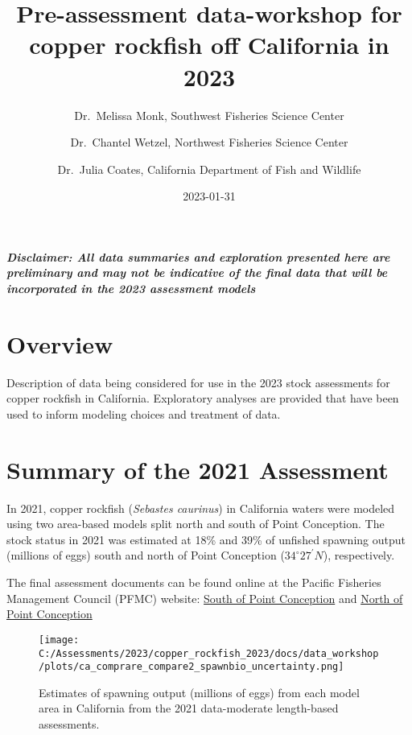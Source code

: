 \documentclass[
]{article}
\title{Pre-assessment data-workshop for copper rockfish off California
in 2023}
\author{Dr.~Melissa Monk, Southwest Fisheries Science
Center \and Dr.~Chantel Wetzel, Northwest Fisheries Science
Center \and Dr.~Julia Coates, California Department of Fish and
Wildlife}
\date{2023-01-31}
\begin{document}
\maketitle

{
\setcounter{tocdepth}{3}
\tableofcontents
}
\textbf{\emph{Disclaimer: All data summaries and exploration presented
here are preliminary and may not be indicative of the final data that
will be incorporated in the 2023 assessment models}}

\hypertarget{overview}{%
\section{Overview}\label{overview}}

Description of data being considered for use in the 2023 stock
assessments for copper rockfish in California. Exploratory analyses are
provided that have been used to inform modeling choices and treatment of
data.

\hypertarget{summary-of-the-2021-assessment}{%
\section{Summary of the 2021
Assessment}\label{summary-of-the-2021-assessment}}

In 2021, copper rockfish (\emph{Sebastes caurinus}) in California waters
were modeled using two area-based models split north and south of Point
Conception. The stock status in 2021 was estimated at 18\% and 39\% of
unfished spawning output (millions of eggs) south and north of Point
Conception (\(34^\circ 27^\prime N\)), respectively.

The final assessment documents can be found online at the Pacific
Fisheries Management Council (PFMC) website:
\href{https://www.pcouncil.org/documents/2022/01/the-status-of-copper-rockfish-sebastes-caurinus-in-u-s-waters-off-the-coast-of-california-south-of-point-conception-in-2021-using-catch-and-length-data-december-2021.pdf/}{South
of Point Conception} and
\href{https://www.pcouncil.org/documents/2022/01/the-status-of-copper-rockfish-sebastes-caurinus-in-u-s-waters-off-the-coast-of-california-north-of-point-conception-in-2021-using-catch-and-length-data-december-2021.pdf/}{North
of Point Conception}

\begin{figure}
\centering
\texttt{[image: C:/Assessments/2023/copper\_rockfish\_2023/docs/data\_workshop/plots/ca\_comprare\_compare2\_spawnbio\_uncertainty.png]}
\caption{Estimates of spawning output (millions of eggs) from each model
area in California from the 2021 data-moderate length-based
assessments.\label{fig:ssb-est}}
\end{figure}
\end{document}
